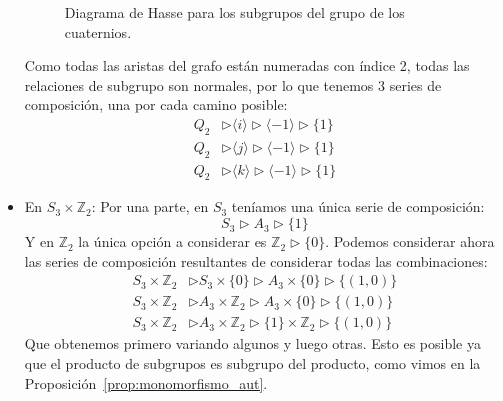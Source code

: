 \begin{ejemplo}
\begin{itemize}
\begin{figure}[H]
                \caption{Diagrama de Hasse para los subgrupos del grupo de los cuaternios.}
            \end{figure}
            Como todas las aristas del grafo están numeradas con índice 2, todas las relaciones de subgrupo son normales, por lo que tenemos 3 series de composición, una por cada camino posible:
            \begin{align*}
                Q_2 &\rhd \langle i \rangle  \rhd \langle -1 \rangle  \rhd \{1\} \\
                Q_2 &\rhd \langle j \rangle  \rhd \langle -1 \rangle  \rhd \{1\} \\
                Q_2 &\rhd \langle k \rangle  \rhd \langle -1 \rangle  \rhd \{1\} 
            \end{align*}
        \item En $S_3\times \mathbb{Z}_2$:
            Por una parte, en $S_3$ teníamos una única serie de composición:
            \begin{equation*}
                S_3 \rhd A_3 \rhd \{1\}
            \end{equation*}
            Y en $\mathbb{Z}_2$ la única opción a considerar es $\mathbb{Z}_2 \rhd \{0\}$.
            Podemos considerar ahora las series de composición resultantes de considerar todas las combinaciones:
            \begin{align*}
                S_3\times \mathbb{Z}_2 &\rhd S_3 \times \{0\} \rhd A_3\times \{0\} \rhd \{(1,0)\} \\
                S_3\times \mathbb{Z}_2 &\rhd A_3\times \mathbb{Z}_2 \rhd A_3 \times \{0\} \rhd \{(1,0)\} \\
                S_3\times \mathbb{Z}_2 &\rhd A_3\times \mathbb{Z}_2 \rhd \{1\}\times \mathbb{Z}_2 \rhd \{(1,0)\}
            \end{align*}
            Que obtenemos primero variando algunos y luego otras. Esto es posible ya que el producto de subgrupos es subgrupo del producto, como vimos en la Proposición~\ref{prop:monomorfismo_aut}.


\end{itemize}
\end{ejemplo}
